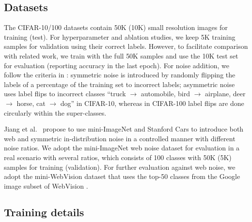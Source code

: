 \documentclass[final]{cvpr}
\begin{document}
\subsection{Datasets}

The CIFAR-10/100 datasets \cite{2009_CIFAR} contain 50K (10K) small resolution images for training (test). For hyperparameter and ablation studies, we keep 5K training samples for validation using their correct labels. However, to facilitate comparison with related work, we train with the full 50K samples and use the 10K test set for evaluation (reporting accuracy in the last epoch). For noise addition, we follow the criteria in \cite{2019_CVPR_JointOptimizImproved}: symmetric noise is introduced by randomly flipping the labels of a percentage of the training set to incorrect labels; asymmetric noise uses label flips to incorrect classes ``truck $\rightarrow$ automobile, bird $\rightarrow$ airplane, deer $\rightarrow$ horse, cat $\rightarrow$ dog'' in CIFAR-10, whereas in CIFAR-100 label flips are done circularly within the super-classes.



Jiang et al.~\cite{2020_ICML_DatasetOOD} propose to use mini-ImageNet and Stanford Cars to introduce both web and symmetric in-distribution
noise in a controlled manner with different noise ratios. We adopt the mini-ImageNet web noise dataset for evaluation in a real scenario with several ratios, which consists of 100 classes with 50K (5K) samples for training (validation). For further evaluation against web noise, we adopt the mini-WebVision dataset \cite{2020_ICLR_DivideMix} that uses the top-50 classes from the Google image subset of WebVision \cite{2017_arXiv_WebVision}.

\subsection{Training details}
\end{document}
